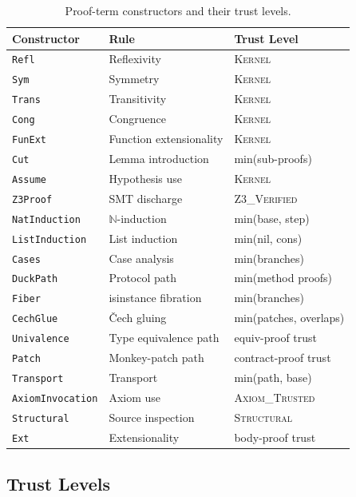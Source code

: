 \documentclass[acmsmall,nonacm,screen]{acmart}
\begin{document}
\begin{table}[t]
\caption{Proof-term constructors and their trust levels.}
\label{tab:proofterms}
\centering\small
\begin{tabular}{@{}lll@{}}
\toprule
Constructor & Rule & Trust Level \\
\midrule
\texttt{Refl} & Reflexivity & \textsc{Kernel} \\
\texttt{Sym} & Symmetry & \textsc{Kernel} \\
\texttt{Trans} & Transitivity & \textsc{Kernel} \\
\texttt{Cong} & Congruence & \textsc{Kernel} \\
\texttt{FunExt} & Function extensionality & \textsc{Kernel} \\
\texttt{Cut} & Lemma introduction & min(sub-proofs) \\
\texttt{Assume} & Hypothesis use & \textsc{Kernel} \\
\texttt{Z3Proof} & SMT discharge & \textsc{Z3\_Verified} \\
\texttt{NatInduction} & $\mathbb{N}$-induction & min(base, step) \\
\texttt{ListInduction} & List induction & min(nil, cons) \\
\texttt{Cases} & Case analysis & min(branches) \\
\texttt{DuckPath} & Protocol path & min(method proofs) \\
\texttt{Fiber} & isinstance fibration & min(branches) \\
\texttt{CechGlue} & \v{C}ech gluing & min(patches, overlaps) \\
\texttt{Univalence} & Type equivalence path & equiv-proof trust \\
\texttt{Patch} & Monkey-patch path & contract-proof trust \\
\texttt{Transport} & Transport & min(path, base) \\
\texttt{AxiomInvocation} & Axiom use & \textsc{Axiom\_Trusted} \\
\texttt{Structural} & Source inspection & \textsc{Structural} \\
\texttt{Ext} & Extensionality & body-proof trust \\
\bottomrule
\end{tabular}
\end{table}

\subsection{Trust Levels}\label{sec:trust}
\end{document}
